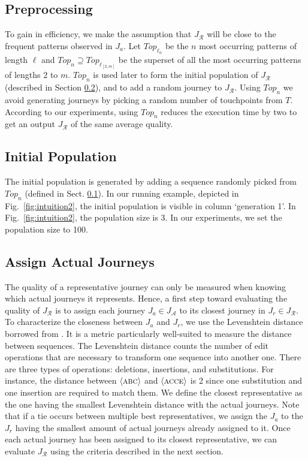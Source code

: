 \documentclass[runningheads]{llncs}
\begin{document}
\subsection{Preprocessing} \label{preprocessing}
To gain in efficiency, we make the assumption that $J_{\mathcal{R}}$ will be close to the frequent patterns observed in $J_{a}$. Let $Top_{\ell_n}$ be the $n$ most occurring patterns of length $\ell$ and $Top_n \supseteq Top_{\ell_{[2,m]}}$ be the superset of all the most occurring patterns of lengths $2$ to $m$.  $Top_n$ is used later to form the initial population of $J_{\mathcal{R}}$ (described in Section \ref{chap:initial-population}), and to add a random journey to $J_{\mathcal{R}}$. Using $Top_n$ we avoid generating journeys by picking a random number of touchpoints from $T$. According to our experiments, using $Top_n$ reduces the execution time by two to get an output $J_{\mathcal{R}}$ of the same average quality.

\subsection{Initial Population}
\label{chap:initial-population}
The initial population is generated by adding a sequence randomly picked from $Top_n$ {(defined in Sect. \ref{preprocessing})}. In our running example, depicted in Fig.~\ref{fig:intuition2}, the initial population is visible in column `generation 1'. In Fig.~\ref{fig:intuition2}, the population size is 3. In our experiments, we set the population size to 100. 

\subsection{Assign Actual Journeys}
The quality of a representative journey can only be measured when knowing which actual journeys it represents. Hence, a first step toward evaluating the quality of $J_{\mathcal{R}}$ is to assign each journey $J_a \in J_{\mathcal{A}}$ to its closest journey in $J_r \in J_{\mathcal{R}}$. To characterize the closeness between $J_a$ and $J_r$, we use the Levenshtein distance borrowed from \cite{levenshtein1966binary}. It is a metric particularly well-suited to measure the distance between sequences. The Levenshtein distance counts the number of edit operations that are necessary to transform one sequence into another one. There are three types of operations: deletions, insertions, and substitutions. For instance, the distance between {$\langle \textsc{abc} \rangle$} and {$\langle \textsc{acce} \rangle$} is 2 since one substitution and one insertion are required to match them. We define the closest representative as the one having the smallest Levenshtein distance with the actual journeys. Note that if a tie occurs between multiple best representatives, we assign the $J_a$ to the $J_r$ having the smallest amount of actual journeys already assigned to it. Once each actual journey has been assigned to its closest representative, we can evaluate $J_{\mathcal{R}}$ using the criteria described in the next section. 
 
\end{document}
